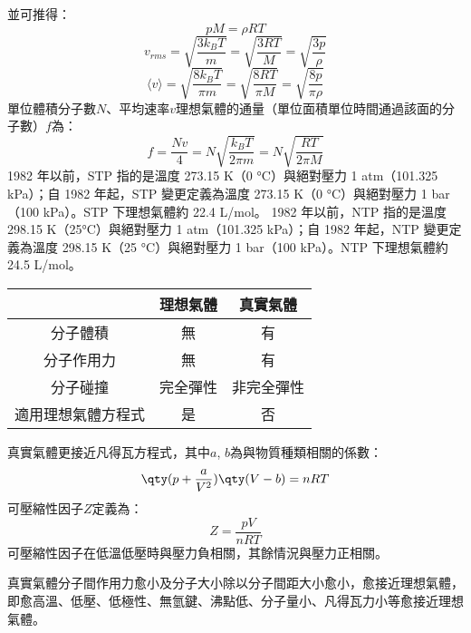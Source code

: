 \documentclass[a4paper,12pt]{report}
\begin{document}
並可推得：
\[pM=\rho RT\]
\[v_{rms}=\sqrt{\frac{3k_BT}{m}}=\sqrt{\frac{3RT}{M}}=\sqrt{\frac{3p}{\rho}}\]
\[\langle v \rangle = \sqrt{\frac{8k_BT}{\pi m}}=\sqrt{\frac{8RT}{\pi M}}=\sqrt{\frac{8p}{\pi \rho}}\]
單位體積分子數$N$、平均速率$v$理想氣體的通量（單位面積單位時間通過該面的分子數）$f$為：
\[f=\frac{Nv}{4}=N\sqrt{\frac{k_BT}{2\pi m}}=N\sqrt{\frac{RT}{2\pi M}}\]
1982 年以前，STP 指的是溫度 273.15 K（0 °C）與絕對壓力 1 atm（101.325 kPa）；自 1982 年起，STP 變更定義為溫度 273.15 K（0 °C）與絕對壓力 1 bar（100 kPa）。STP 下理想氣體約 22.4 L/mol。
1982 年以前，NTP 指的是溫度 298.15 K（25°C）與絕對壓力 1 atm（101.325 kPa）；自 1982 年起，NTP 變更定義為溫度 298.15 K（25 °C）與絕對壓力 1 bar（100 kPa）。NTP 下理想氣體約 24.5 L/mol。
\begin{longtable}[c]{|c|c|c|}
\hline
& 理想氣體 & 真實氣體 \\\hline\endhead
分子體積 & 無 & 有 \\\hline
分子作用力 & 無 & 有 \\\hline
分子碰撞 & 完全彈性 & 非完全彈性 \\\hline
適用理想氣體方程式 & 是 & 否 \\\hline
\end{longtable}\FB
{}
真實氣體更接近凡得瓦方程式，其中$a$, $b$為與物質種類相關的係數：
\[\qty(p + \frac{a}{V^2})\qty(V - b) = nRT\]
可壓縮性因子$Z$定義為：
\[Z=\frac{pV}{nRT}\]
可壓縮性因子在低溫低壓時與壓力負相關，其餘情況與壓力正相關。

真實氣體分子間作用力愈小及分子大小除以分子間距大小愈小，愈接近理想氣體，即愈高溫、低壓、低極性、無氫鍵、沸點低、分子量小、凡得瓦力小等愈接近理想氣體。
\end{document}
